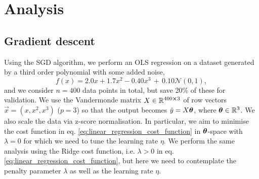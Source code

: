 \section{Analysis}\label{sec:analysis}






\subsection{Gradient descent}\label{sec:analysis_SGD}


    Using the SGD algorithm, we perform an OLS regression on a dataset generated by a third order polynomial with some added noise,
    \begin{equation}
        f(x) = 2.0x + 1.7x^2 -0.40x^3 \, +\, 0.10\mathcal{N}(0, 1),
    \end{equation}
    and we consider $n=400$ data points in total, but save 20\% of these for validation. We use the Vandermonde matrix $X\in \RR[400 \cross 3]$ of row vectors $\vec{x} = (x, x^2, x^3)$ ($p=3$) so that the output becomes $\hat{y} = X\svec{\theta}$, where $\svec{\theta}\in \RR[3]$. We also scale the data via z-score normalisation. In particular, we aim to minimise the cost function in eq. \eqref{eq:linear_regression_cost_function} in $\svec{\theta}$-space with $\lambda=0$ for which we need to tune the learning rate $\eta$. We perform the same analysis using the Ridge cost function, i.e. $\lambda > 0$ in eq. \eqref{eq:linear_regression_cost_function}, but here we need to contemplate the penalty parameter $\lambda$ as well as the learning rate $\eta$.

